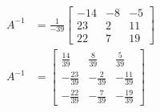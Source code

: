 \documentclass{article}
\begin{document}
\begin{align*}
	A^{-1} & = \frac{1}{-39}\begin{bmatrix}
		-14 & -8 & -5 \\
		23 & 2 & 11 \\
		22 & 7 & 19
	\end{bmatrix} \\
	A^{-1} & = \begin{bmatrix}
		\frac{14}{39} & \frac{8}{39} & \frac{5}{39} \\
		-\frac{23}{39} & -\frac{2}{39} & -\frac{11}{39} \\
		-\frac{22}{39} & -\frac{7}{39} & -\frac{19}{39}
	\end{bmatrix}
\end{align*}
\end{document}
